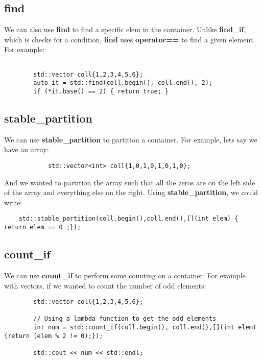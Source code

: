 \documentclass{report}
\begin{document}
    \subsection{find}
    We can also use \textbf{find} to find a specific elem in the container. Unlike \textbf{find\_if}, which is checks for a condition, \textbf{find} uses \textbf{operator==} to find a given element. For example:
    \begin{verbatim}
        
        std::vector coll{1,2,3,4,5,6};
        auto it = std::find(coll.begin(), coll.end(), 2);
        if (*it.base() == 2) { return true; }
    \end{verbatim}
        \subsection{stable\_partition}
        We can use \textbf{stable\_partition} to partition a container. For example, lets say we have an array:
        \begin{verbatim}
            std::vector<int> coll{1,0,1,0,1,0,1,0};
        \end{verbatim}
            And we wanted to partition the array such that all the zeros are on the left side of the array and everything else on the right.
Using \textbf{stable\_partition}, we could write:
\begin{verbatim}
    std::stable_partition(coll.begin(),coll.end(),[](int elem) { return elem == 0 ;});
\end{verbatim}
    \subsection{count\_if}
    We can use \textbf{count\_if} to perform some counting on a container. For example with vectors, if we wanted to count the number of odd elements:
    \begin{verbatim}
        std::vector coll{1,2,3,4,5,6};

        // Using a lambda function to get the odd elements
        int num = std::count_if(coll.begin(), coll.end(),[](int elem){return (elem % 2 != 0);});
    
        std::cout << num << std::endl;
    \end{verbatim}
\end{document}
